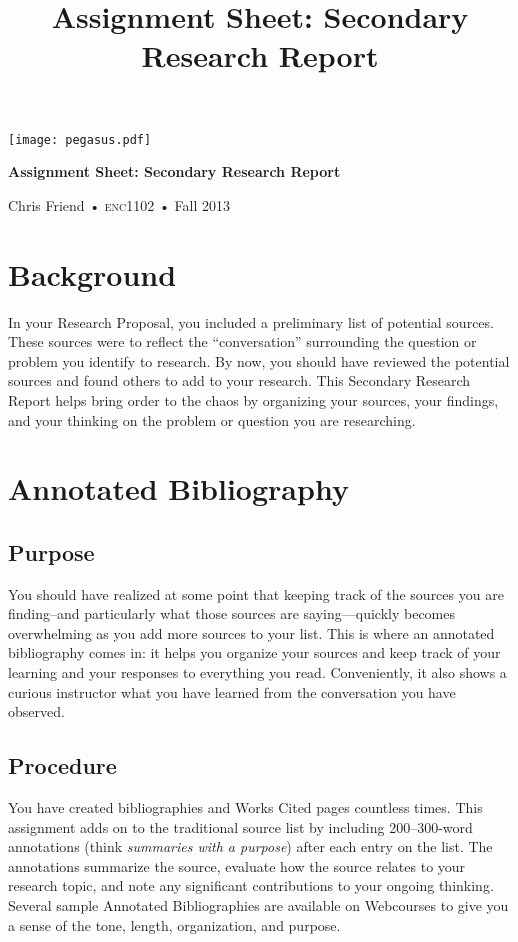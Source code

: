 \documentclass[11pt, oneside]{amsart}	%
\title[Secondary Research Report]{Assignment Sheet: Secondary Research Report}
\begin{document}
%
\thispagestyle{empty}

\vspace{-2in}
\begin{center}
\huge
\texttt{[image: pegasus.pdf]}

\textbf{Assignment Sheet: Secondary Research Report}

{\normalsize Chris Friend • \textsc{enc1102} • Fall 2013}
\end{center}
\vspace{1.5\baselineskip}

\section{Background} %
\label{sec:background}
In your Research Proposal, you included a preliminary list of potential sources. These sources were to reflect the “conversation” surrounding the question or problem you identify to research. By now, you should have reviewed the potential sources and found others to add to your research. This Secondary Research Report helps bring order to the chaos by organizing your sources, your findings, and your thinking on the problem or question you are researching.


\section{Annotated Bibliography} %
\label{sec:annotated_bibliography}

\subsection{Purpose} %
\label{sec:bib-purpose}
You should have realized at some point that keeping track of the sources you are finding–and particularly what those sources are saying—quickly becomes overwhelming as you add more sources to your list. This is where an annotated bibliography comes in: it helps you organize your sources and keep track of your learning and your responses to everything you read. Conveniently, it also shows a curious instructor what you have learned from the conversation you have observed.

\subsection{Procedure} %
\label{sec:bib-procedure}
You have created bibliographies and Works Cited pages countless times. This assignment adds on to the traditional source list by including 200–300-word annotations (think \emph{summaries with a purpose}) after each entry on the list. The annotations summarize the source, evaluate how the source relates to your research topic, and note any significant contributions to your ongoing thinking. Several sample Annotated Bibliographies are available on Webcourses to give you a sense of the tone, length, organization, and purpose.
\end{document}
